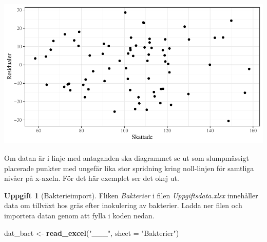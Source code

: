 \documentclass[
]{book}
\newenvironment{Shaded}{\begin{snugshade}}{\end{snugshade}}
\newcommand{\AttributeTok}[1]{\textcolor[rgb]{0.13,0.29,0.53}{#1}}
\newcommand{\FunctionTok}[1]{\textcolor[rgb]{0.13,0.29,0.53}{\textbf{#1}}}
\newcommand{\NormalTok}[1]{#1}
\newcommand{\OtherTok}[1]{\textcolor[rgb]{0.56,0.35,0.01}{#1}}
\newcommand{\StringTok}[1]{\textcolor[rgb]{0.31,0.60,0.02}{#1}}
\theoremstyle{definition}
\theoremstyle{definition}
\theoremstyle{definition}
\newtheorem{exercise}{Uppgift}[chapter]
\theoremstyle{definition}
\theoremstyle{remark}
\begin{document}
\begin{center}\includegraphics{R-anvisningar_files/figure-latex/unnamed-chunk-242-1} \end{center}

Om datan är i linje med antaganden ska diagrammet se ut som slumpmässigt placerade punkter med ungefär lika stor spridning kring noll-linjen för samtliga nivåer på x-axeln. För det här exemplet ser det okej ut.

\begin{exercise}[Bakterieimport]

Fliken \emph{Bakterier} i filen \emph{Uppgiftsdata.xlsx} innehåller data om tillväxt hos gräs efter inokulering av bakterier. Ladda ner filen och importera datan genom att fylla i koden nedan.

\begin{Shaded}
\begin{Highlighting}[]
\NormalTok{dat\_bact }\OtherTok{\textless{}{-}} \FunctionTok{read\_excel}\NormalTok{(}\StringTok{"\_\_\_"}\NormalTok{, }\AttributeTok{sheet =} \StringTok{"Bakterier"}\NormalTok{)}
\end{Highlighting}
\end{Shaded}

\end{exercise}
\end{document}
